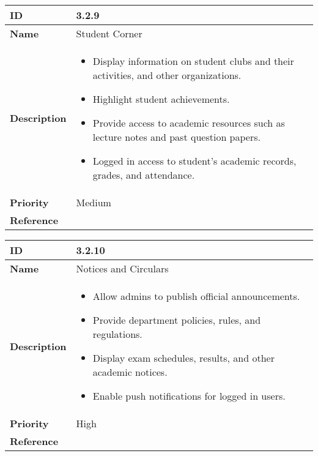 \begin{center}
\begin{tabular}{ | >{\bfseries}m{5em} | m{10cm} |  } 
  \hline
  ID & 3.2.9\\  
  \hline
  Name & Student Corner \\  
  \hline
  Description & 
  \begin{itemize}
      \item Display information on student clubs and their activities, and other organizations.
      \item Highlight student achievements.
      \item Provide access to academic resources such as lecture notes and past question papers.
      \item Logged in access to student's academic records, grades, and attendance.
  \end{itemize} \\ 
  \hline
  Priority & Medium\\
  \hline 
  Reference & \\
  \hline
\end{tabular}
\end{center}

\vspace{0.5cm}

\begin{center}
  \begin{tabular}{ | >{\bfseries}m{5em} | m{10cm} |  } 
    \hline
    ID & 3.2.10\\  
    \hline
    Name & Notices and Circulars \\  
    \hline
    Description & 
    \begin{itemize}
        \item Allow admins to publish official announcements.
        \item Provide department policies, rules, and regulations.
        \item Display exam schedules, results, and other academic notices.
        \item Enable push notifications for logged in users.
    \end{itemize} \\ 
    \hline
    Priority & High\\
    \hline 
    Reference & \\
    \hline
    
  \end{tabular}
\end{center}

